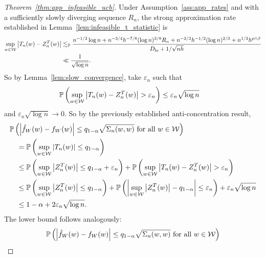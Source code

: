 \begin{proof}[Theorem~\ref{thm:app_infeasible_ucb}]
  Under Assumption~\ref{ass:app_rates} and with a
  sufficiently slowly diverging sequence $R_n$,
  the strong approximation rate established in
  Lemma~\ref{lem:infeasible_t_statistic} is
  \begin{align*}
    \sup_{w \in \mathcal{W}} \left| T_n(w) - Z_n^T(w) \right|
    &\lesssim_{\mathbb{P}}
    \frac{
      n^{-1/2} \log n
      + n^{-3/4} h^{-7/8} (\log n)^{3/8} R_n
      + n^{-2/3} h^{-1/2} (\log n)^{2/3}
      + n^{1/2} h^{p \wedge \beta}}
    {D_{\textup{lo}} + 1/\sqrt{nh}} \\
    &\ll
    \frac{1}{\sqrt{\log n}}.
  \end{align*}
  So by Lemma~\ref{lem:slow_convergence},
  take $\varepsilon_n$ such that
  \begin{align*}
    \mathbb{P} \left(
      \sup_{w \in \mathcal{W}} \left| T_n(w) - Z_n^T(w) \right|
      > \varepsilon_n
    \right)
    &\leq
    \varepsilon_n \sqrt{\log n}
  \end{align*}
  and $\varepsilon_n \sqrt{\log n} \to 0$.
  So by the previously established anti-concentration result,
  \begin{align*}
    &\mathbb{P}\left(
      \left|
      \hat f_W(w) - f_W(w)
      \right|
      \leq
      q_{1-\alpha}
      \sqrt{\Sigma_n(w,w)}
      \textup{ for all }
      w \in \mathcal{W}
    \right) \\
    &\quad=
    \mathbb{P}\left(
      \sup_{w \in \mathcal{W}}
      \left| T_n(w) \right|
      \leq
      q_{1-\alpha}
    \right) \\
    &\quad\leq
    \mathbb{P}\left(
      \sup_{w \in \mathcal{W}}
      \left| Z_n^T(w) \right|
      \leq
      q_{1-\alpha}
      + \varepsilon_n
    \right)
    + \mathbb{P} \left(
      \sup_{w \in \mathcal{W}} \left| T_n(w) - Z_n^T(w) \right|
      > \varepsilon_n
    \right) \\
    &\quad\leq
    \mathbb{P}\left(
      \sup_{w \in \mathcal{W}}
      \left|
      Z_n^T(w)
      \right|
      \leq
      q_{1-\alpha}
    \right)
    + \mathbb{P}\left(
      \left|
      \sup_{w \in \mathcal{W}}
      \big| Z_n^T(w) \big|
      - q_{1-\alpha}
      \right|
      \leq \varepsilon_n
    \right)
    + \varepsilon_n \sqrt{\log n} \\
    &\quad\leq
    1 - \alpha
    + 2 \varepsilon_n \sqrt{\log n}.
  \end{align*}
  The lower bound follows analogously:
  \begin{align*}
    &\P\left(
      \left|
      \hat f_W(w) - f_W(w)
      \right|
      \leq
      q_{1-\alpha}
      \sqrt{\Sigma_n(w,w)}
      \textup{ for all }
      w \in \cW
    \right) \\

\end{align*}
\end{proof}

